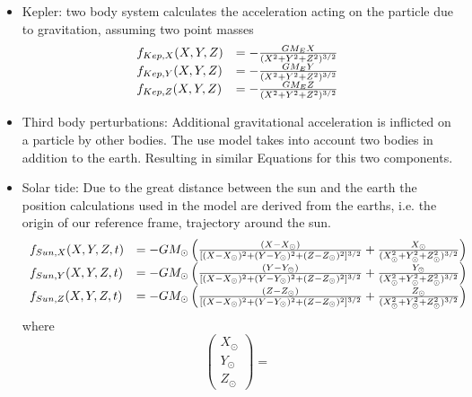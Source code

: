 \documentclass[11pt,
               a4paper,
               bibtotoc,
               idxtotoc,
               headsepline,
               footsepline,
               footexclude,
               BCOR12mm,
               DIV13,
               openany,   %
               ]
               {scrbook}
\begin{document}
\begin{itemize}
        \item Kepler: two body system calculates the acceleration acting on the particle due to gravitation, assuming two point masses
        \begin{equation}
            \begin{array}{ll}
                f_{Kep,X}(X,Y,Z) &= -{GM_E X\over (X^2+Y^2+Z^2)^{3/2}}\\
                f_{Kep,Y}(X,Y,Z) &= -{GM_E Y\over (X^2+Y^2+Z^2)^{3/2}}\\
                f_{Kep,Z}(X,Y,Z) &= -{GM_E Z\over (X^2+Y^2+Z^2)^{3/2}}
            \end{array}
        \end{equation}
        \item Third body perturbations: Additional gravitational acceleration is inflicted on a particle by other bodies.
        The use model takes into account two bodies in addition to the earth. Resulting in similar Equations for this two components.
        \item Solar tide: Due to the great distance between the sun and the earth the position calculations used in the model are derived from the earths,
        i.e. the origin of our reference frame, trajectory around the sun.
        \begin{equation}
            \begin{array}{ll}
                f_{Sun,X}(X,Y,Z,t) &=-G M_\odot\left(
                {(X-X_\odot)\over [(X-X_\odot)^2+(Y-Y_\odot)^2+(Z-Z_\odot)^2]^{3/2}}
                +{X_\odot\over(X_\odot^2+Y_\odot^2+Z_\odot^2)^{3/2}} \right)\\
                f_{Sun,Y}(X,Y,Z,t) &=-G M_\odot\left(
                {(Y-Y_\odot)\over [(X-X_\odot)^2+(Y-Y_\odot)^2+(Z-Z_\odot)^2]^{3/2}}
                +{Y_\odot\over(X_\odot^2+Y_\odot^2+Z_\odot^2)^{3/2}} \right)\\
                f_{Sun,Z}(X,Y,Z,t) &=-G M_\odot\left(
                {(Z-Z_\odot)\over [(X-X_\odot)^2+(Y-Y_\odot)^2+(Z-Z_\odot)^2]^{3/2}}
                +{Z_\odot\over(X_\odot^2+Y_\odot^2+Z_\odot^2)^{3/2}} \right)
            \end{array}
        \end{equation}
        where
        \begin{equation}
            \begin{pmatrix}
                X_\odot\\
                Y_\odot\\
                Z_\odot
            \end{pmatrix} =

\end{equation}
\end{itemize}
\end{document}
